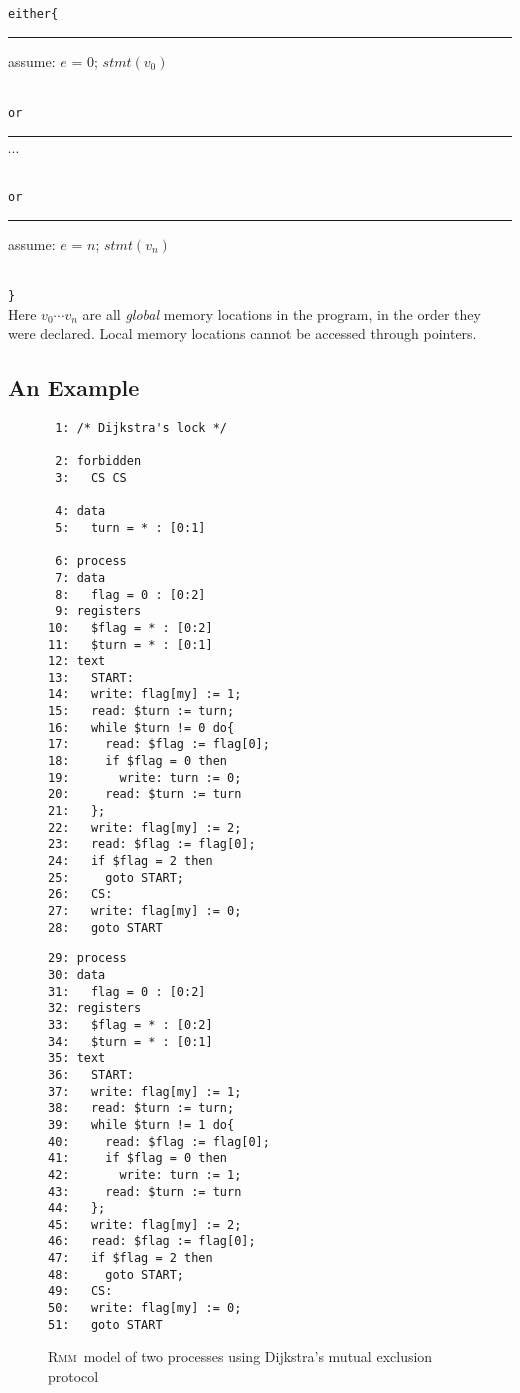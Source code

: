 \documentclass[a4paper]{article}
\newcommand{\rmm}{\textsc{Rmm}}
\begin{document}
\noindent
{\tt either\{}\\
{\tt \rule{5pt}{0pt} assume: $e$ = 0; $stmt(v_0)$}\\
{\tt or}\\
{\tt \rule{5pt}{0pt} $\cdots$}\\
{\tt or}\\
{\tt \rule{5pt}{0pt} assume: $e$ = $n$; $stmt(v_n)$}\\
{\tt \}}\\

Here $v_0 \cdots v_n$ are all {\em global} memory locations in the
program, in the order they were declared. Local memory locations
cannot be accessed through pointers.

\subsection{An Example}

\begin{figure}[ht]
\begin{minipage}[b]{0.5\linewidth}
\small{
\begin{verbatim}
 1: /* Dijkstra's lock */

 2: forbidden
 3:   CS CS

 4: data
 5:   turn = * : [0:1]

 6: process
 7: data
 8:   flag = 0 : [0:2]
 9: registers
10:   $flag = * : [0:2]
11:   $turn = * : [0:1]
12: text
13:   START:
14:   write: flag[my] := 1;
15:   read: $turn := turn;
16:   while $turn != 0 do{
17:     read: $flag := flag[0];
18:     if $flag = 0 then
19:       write: turn := 0;
20:     read: $turn := turn
21:   };
22:   write: flag[my] := 2;
23:   read: $flag := flag[0];
24:   if $flag = 2 then
25:     goto START;
26:   CS:
27:   write: flag[my] := 0;
28:   goto START
\end{verbatim}
}
\end{minipage}
\hspace{0pt}
\begin{minipage}[b]{0.45\linewidth}
\small{
\begin{verbatim}
29: process
30: data
31:   flag = 0 : [0:2]
32: registers
33:   $flag = * : [0:2]
34:   $turn = * : [0:1]
35: text
36:   START:
37:   write: flag[my] := 1;
38:   read: $turn := turn;
39:   while $turn != 1 do{
40:     read: $flag := flag[0];
41:     if $flag = 0 then
42:       write: turn := 1;
43:     read: $turn := turn
44:   };
45:   write: flag[my] := 2;
46:   read: $flag := flag[0];
47:   if $flag = 2 then
48:     goto START;
49:   CS:
50:   write: flag[my] := 0;
51:   goto START
\end{verbatim}
}
\end{minipage}
\caption{\rmm\ model of two processes using Dijkstra's mutual exclusion protocol\cite{LP93}}\label{fig:code:dijkstra.rmm}
\end{figure}
\end{document}
